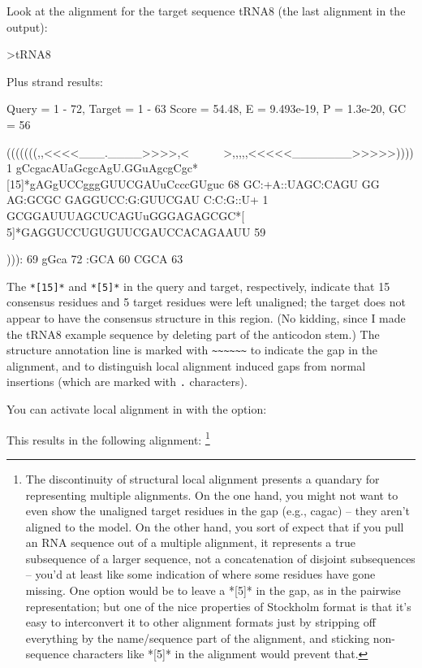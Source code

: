
Look at the alignment for the target sequence tRNA8 (the last alignment in the output): 

\begin{sreoutput}
>tRNA8

  Plus strand results:

 Query = 1 - 72, Target = 1 - 63
 Score = 54.48, E = 9.493e-19, P = 1.3e-20, GC =  56

           (((((((,,<<<<___.____>>>>,<~~~~~~>,,,,,<<<<<_______>>>>>))))
         1 gCcgacAUaGcgcAgU.GGuAgcgCgc*[15]*gAGgUCCgggGUUCGAUuCcccGUguc 68      
           GC:+A::UAGC:CAGU GG AG:GCGC      GAGGUCC:G:GUUCGAU C:C:G::U+
         1 GCGGAUUUAGCUCAGUuGGGAGAGCGC*[ 5]*GAGGUCCUGUGUUCGAUCCACAGAAUU 59      

           ))):
        69 gGca 72      
           :GCA
        60 CGCA 63      
\end{sreoutput}

The \verb+*[15]*+ and \verb+*[5]*+ in the query and target,
respectively, indicate that 15 consensus residues and 5 target
residues were left unaligned; the target does not appear to have the
consensus structure in this region. (No kidding, since I made the
tRNA8 example sequence by deleting part of the anticodon stem.)  The
structure annotation line is marked with \verb+~~~~~~+ to indicate the
gap in the alignment, and to distinguish local alignment induced gaps
from normal insertions (which are marked with \verb+.+ characters).

You can activate local alignment in  with the 
option:


This results in the following alignment:
\footnote{The discontinuity of structural local alignment presents a
quandary for representing multiple alignments. On the one hand, you
might not want to even show the unaligned target residues in the gap
(e.g., cagac) -- they aren't aligned to the model. On the other hand,
you sort of expect that if you pull an RNA sequence out of a multiple
alignment, it represents a true subsequence of a larger sequence, not
a concatenation of disjoint subsequences -- you'd at least like some
indication of where some residues have gone missing. One option would
be to leave a *[5]* in the gap, as in the pairwise
representation; but one of the nice properties of Stockholm format is
that it's easy to interconvert it to other alignment formats just by
stripping off everything by the name/sequence part of the alignment,
and sticking non-sequence characters like *[5]* in the
alignment would prevent that.}

